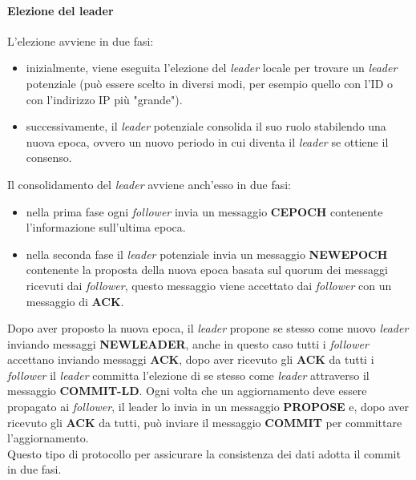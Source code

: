 \documentclass{article}
\begin{document}
\paragraph{Elezione del leader}
L'elezione avviene in due fasi:
\begin{itemize}
    \item inizialmente, viene eseguita l'elezione del \textit{leader} locale per trovare un \textit{leader} potenziale (può essere scelto in diversi modi, per esempio quello con l'ID o con l'indirizzo IP più "grande").
    \item successivamente, il \textit{leader} potenziale consolida il suo ruolo stabilendo una nuova epoca, ovvero un nuovo periodo in cui diventa il \textit{leader} se ottiene il consenso.
\end{itemize}
Il consolidamento del \textit{leader} avviene anch'esso in due fasi:
\begin{itemize}
    \item nella prima fase ogni \textit{follower} invia un messaggio \textbf{CEPOCH} contenente l'informazione sull'ultima epoca.
    \item nella seconda fase il \textit{leader} potenziale invia un messaggio \textbf{NEWEPOCH} contenente la proposta della nuova epoca basata sul quorum dei messaggi ricevuti dai \textit{follower}, questo messaggio viene accettato dai \textit{follower} con un messaggio di \textbf{ACK}.
\end{itemize}
Dopo aver proposto la nuova epoca, il \textit{leader} propone se stesso come nuovo \textit{leader} inviando messaggi \textbf{NEWLEADER}, anche in questo caso tutti i \textit{follower} accettano inviando messaggi \textbf{ACK}, dopo aver ricevuto gli \textbf{ACK} da tutti i \textit{follower} il \textit{leader} committa l'elezione di se stesso come \textit{leader} attraverso il messaggio \textbf{COMMIT-LD}. 
Ogni volta che un aggiornamento deve essere propagato ai \textit{follower}, il leader lo invia in un messaggio \textbf{PROPOSE} e, dopo aver ricevuto gli \textbf{ACK} da tutti, può inviare il messaggio \textbf{COMMIT} per committare l'aggiornamento.\\
Questo tipo di protocollo per assicurare la consistenza dei dati adotta il commit in due fasi.
\end{document}
